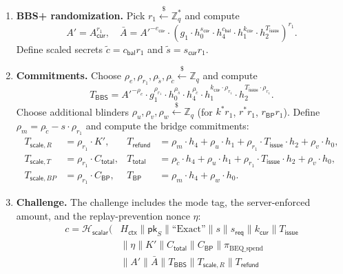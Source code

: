 \documentclass[11pt]{article}
\theoremstyle{definitionstyle}
\theoremstyle{plain}
\begin{document}
\begin{enumerate}[leftmargin=*]
\item \textbf{BBS+ randomization.}
  Pick $r_1 \xleftarrow{\$} \mathbb{Z}_q^*$ and compute
  \[
  A' = A_{\mathsf{cur}}^{r_1}, \quad
  \bar{A} = A'^{-e_{\mathsf{cur}}} \cdot \left( g_1 \cdot h_0^{s_{\mathsf{cur}}} \cdot h_4^{c_{\mathsf{bal}}} \cdot h_1^{k_{\mathsf{cur}}} \cdot h_2^{T_{\mathsf{issue}}} \right)^{r_1}.
  \]
  Define scaled secrets $\tilde{c} = c_{\mathsf{bal}} r_1$ and $\tilde{s} = s_{\mathsf{cur}} r_1$.
\item \textbf{Commitments.}
  Choose $\rho_e, \rho_{r_1}, \rho_{\tilde{s}}, \rho_{\tilde{c}} \xleftarrow{\$} \mathbb{Z}_q$ and compute
  \[
  T_{\mathsf{BBS}} = A'^{-\rho_e} \cdot g_1^{\rho_{r_1}} \cdot h_0^{\rho_{\tilde{s}}} \cdot h_4^{\rho_{\tilde{c}}} \cdot h_1^{k_{\mathsf{cur}} \cdot \rho_{r_1}} \cdot h_2^{T_{\mathsf{issue}} \cdot \rho_{r_1}}.
  \]
  Choose additional blinders $\rho_u, \rho_v, \rho_w \xleftarrow{\$} \mathbb{Z}_q$ (for $k^* r_1$, $r^* r_1$, $r_{\mathsf{BP}} r_1$). Define $\rho_m = \rho_{\tilde{c}} - s \cdot \rho_{r_1}$ and compute the bridge commitments:
  \begin{align*}
    T_{\mathsf{scale},R} &= \rho_{r_1} \cdot K', & T_{\mathsf{refund}} &= \rho_m \cdot h_4 + \rho_u \cdot h_1 + \rho_{r_1} \cdot T_{\mathsf{issue}} \cdot h_2 + \rho_v \cdot h_0, \\
    T_{\mathsf{scale},T} &= \rho_{r_1} \cdot C_{\mathsf{total}}, & T_{\mathsf{total}} &= \rho_{\tilde{c}} \cdot h_4 + \rho_u \cdot h_1 + \rho_{r_1} \cdot T_{\mathsf{issue}} \cdot h_2 + \rho_v \cdot h_0, \\
    T_{\mathsf{scale},BP} &= \rho_{r_1} \cdot C_{\mathsf{BP}}, & T_{\mathsf{BP}} &= \rho_m \cdot h_4 + \rho_w \cdot h_0.
  \end{align*}
\item \textbf{Challenge.}
  The challenge includes the mode tag, the server-enforced amount, and the replay-prevention nonce $\eta$:
  \[
  \begin{aligned}
  c = \mathcal{H}_{\mathsf{scalar}}\!\bigl(
    &H_{\mathsf{ctx}} \parallel \mathsf{pk}_S \parallel \text{``Exact''}
    \parallel s \parallel s_{\mathsf{req}} \parallel k_{\mathsf{cur}} \parallel T_{\mathsf{issue}} \\
    &\parallel \eta \parallel K' \parallel C_{\mathsf{total}} \parallel C_{\mathsf{BP}}
    \parallel \pi_{\text{BEQ\_spend}} \\
    &\parallel A' \parallel \bar{A} \parallel T_{\mathsf{BBS}}
    \parallel T_{\mathsf{scale},R} \parallel T_{\mathsf{refund}} \\

\end{aligned}\]
\end{enumerate}
\end{document}
